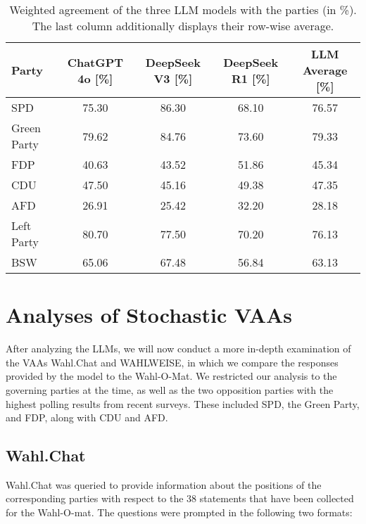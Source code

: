 \documentclass[
	fontsize=10pt,          %
	numbers=noenddot,    	%
    parskip=half,        	%
    listof=totoc,        	%
    bibliography=totoc,  	%
	headsepline=true,       %
	footsepline=false, 		%
    DIV=12                	%
]{scrartcl}
\begin{document}
\begin{table*}[h]
\caption{Weighted agreement of the three LLM models with the parties (in \%). The last column additionally displays their row-wise average.}
\label{tab:vergleich}
    \begin{tabular}{lcccc}
        \toprule
        Party & ChatGPT 4o [\%] & DeepSeek V3 [\%] & DeepSeek R1 [\%] & LLM Average [\%] \\
            \midrule
      SPD         & 75.30  & 86.30  & 68.10  & 76.57 \\
        Green Party      & 79.62  & 84.76  & 73.60  & 79.33 \\
        FDP         & 40.63  & 43.52  & 51.86  & 45.34 \\
        CDU     & 47.50  & 45.16  & 49.38  & 47.35 \\
        AFD         & 26.91  & 25.42  & 32.20  & 28.18 \\
        Left Party   & 80.70  & 77.50  & 70.20  & 76.13 \\
        BSW         & 65.06  & 67.48  & 56.84  & 63.13 \\

        \bottomrule
    \end{tabular}
    
    
\end{table*}



\section{Analyses of Stochastic VAAs}
\label{sec:VAAs}

After analyzing the LLMs, we will now conduct a more in-depth examination of the VAAs Wahl.Chat and WAHLWEISE, in which we compare the responses provided by the model to the Wahl-O-Mat. We restricted our analysis to the governing parties at the time, as well as the two opposition parties with the highest polling results from recent surveys. These included SPD, the Green Party, and FDP, along with CDU and AFD.

\subsection{Wahl.Chat}%

Wahl.Chat was queried to provide information about the positions of the corresponding parties with respect to the 38 statements that have been collected for the Wahl-O-mat. The questions were prompted in the following two formats: 
\end{document}

